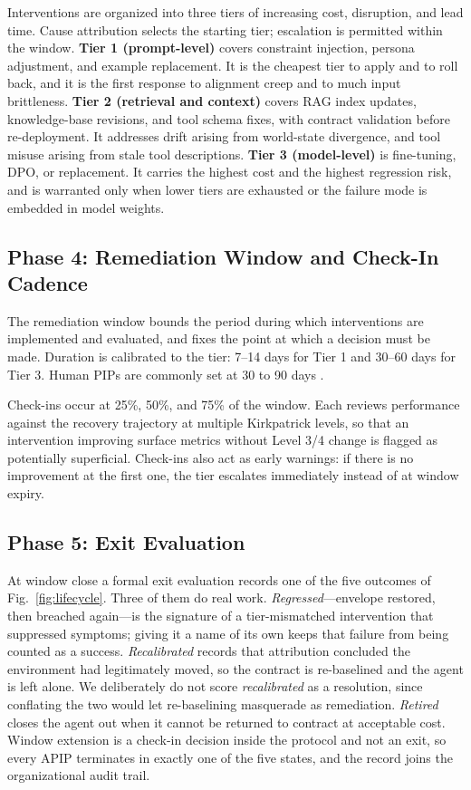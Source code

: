 \documentclass[conference]{IEEEtran}
\begin{document}
Interventions are organized into three tiers of increasing cost, disruption,
and lead time. Cause attribution selects the starting tier; escalation is
permitted within the window. \textbf{Tier 1 (prompt-level)} covers constraint
injection, persona adjustment, and example replacement. It is the cheapest tier
to apply and to roll back, and it is the first response to alignment creep and
to much input brittleness. \textbf{Tier 2 (retrieval and context)} covers RAG
index updates, knowledge-base revisions, and tool schema fixes, with contract
validation before re-deployment. It addresses drift arising from world-state
divergence, and tool misuse arising from stale tool descriptions.
\textbf{Tier 3 (model-level)} is fine-tuning, DPO, or replacement. It carries
the highest cost and the highest regression risk, and is warranted only when
lower tiers are exhausted or the failure mode is embedded in model weights.

\subsection{Phase 4: Remediation Window and Check-In Cadence}

The remediation window bounds the period during which interventions are
implemented and evaluated, and fixes the point at which a decision must be
made. Duration is calibrated to the tier: 7--14 days for Tier 1 and 30--60 days
for Tier 3. Human PIPs are commonly set at 30 to 90 days \cite{shrm2023}.

Check-ins occur at 25\%, 50\%, and 75\% of the window. Each reviews performance
against the recovery trajectory at multiple Kirkpatrick levels, so that an
intervention improving surface metrics without Level 3/4 change is flagged as
potentially superficial. Check-ins also act as early warnings: if there is no
improvement at the first one, the tier escalates immediately instead of at
window expiry.

\subsection{Phase 5: Exit Evaluation}
\label{sec:exit}

At window close a formal exit evaluation records one of the five outcomes of
Fig.~\ref{fig:lifecycle}. Three of them do real work. \emph{Regressed}---envelope
restored, then breached again---is the signature of a tier-mismatched
intervention that suppressed symptoms; giving it a name of its own keeps that
failure from being counted as a success. \emph{Recalibrated} records that
attribution concluded the environment had legitimately moved, so the contract
is re-baselined and the agent is left alone. We deliberately do not score
\emph{recalibrated} as a resolution, since conflating the two would let
re-baselining masquerade as remediation. \emph{Retired} closes the agent out
when it cannot be returned to contract at acceptable cost. Window extension is
a check-in decision inside the protocol and not an exit, so every APIP
terminates in exactly one of the five states, and the record joins the
organizational audit trail.
\end{document}
